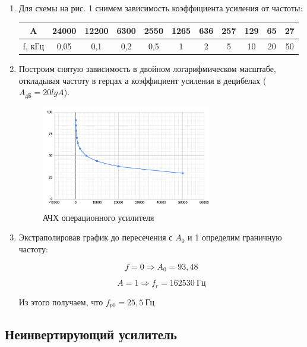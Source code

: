 \documentclass[a4paper, 12pt]{article}%
\begin{document}
\begin{enumerate}

\item Для схемы на рис. 1 снимем зависимость коэффициента усиления от частоты:

\begin{center}
\begin{tabular}{|c|c|c|c|c|c|c|c|c|c|c|}
\hline 
A & 24000 & 12200 & 6300 & 2550 & 1265 & 636 & 257 & 129 & 65 & 27 \\ 
\hline 
f, кГц & 0,05 & 0,1 & 0,2 & 0,5 & 1 & 2 & 5 & 10 & 20 & 50 \\ 
\hline 
\end{tabular} 
\end{center}

\item Построим снятую зависимость в двойном логарифмическом масштабе, откладывая частоту в герцах а коэффициент усиления в децибелах ($A_{\text{дБ}} = 20lgA$).

\begin{figure}[h]
\begin{center}
\includegraphics[width = 0.7\textwidth]{graph1.png}
\caption{АЧХ операционного усилителя}
\end{center}
\end{figure}

\item Экстраполировав график до пересечения с $A_0$ и 1 определим граничную частоту:

\[f = 0 \Rightarrow A_0 = 93,48\]

\[A = 1 \Rightarrow f_r = 162530 \: \text{Гц}\]

Из этого получаем, что $f_{p0} = 25,5 \: \text{Гц}$

\end{enumerate}

\newpage
\subsection{Неинвертирующий усилитель}
\end{document}
